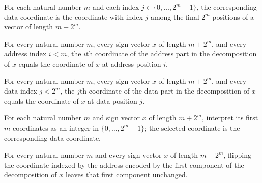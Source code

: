 \begin{definition}
\label{FABL.addressingDataCoordinate}
\leanok
For each natural number $m$ and each index $j\in\{0,\ldots,2^m-1\}$, the corresponding
data coordinate is the coordinate with index $j$ among the final $2^m$ positions of a
vector of length $m+2^m$.
\end{definition}

\begin{theorem}
\label{FABL.addressingInputEquiv_addressCoordinate}
\leanok
{}
For every natural number $m$, every sign vector $x$ of length $m+2^m$, and every address
index $i<m$, the $i$th coordinate of the address part in the decomposition of $x$ equals
the coordinate of $x$ at address position $i$.
\end{theorem}

\begin{theorem}
\label{FABL.addressingInputEquiv_dataCoordinate}
\leanok
{}
For every natural number $m$, every sign vector $x$ of length $m+2^m$, and every data
index $j<2^m$, the $j$th coordinate of the data part in the decomposition of $x$ equals
the coordinate of $x$ at data position $j$.
\end{theorem}

\begin{definition}
\label{FABL.addressingSelectedCoordinate}
\leanok
{}
For each natural number $m$ and sign vector $x$ of length $m+2^m$, interpret its first
$m$ coordinates as an integer in $\{0,\ldots,2^m-1\}$; the selected coordinate is the
corresponding data coordinate.
\end{definition}

\begin{theorem}
\label{FABL.addressingInputEquiv_first_flip_selected}
\leanok
{}
For every natural number $m$ and every sign vector $x$ of length $m+2^m$, flipping the
coordinate indexed by the address encoded by the first component of the decomposition of
$x$ leaves that first component unchanged.
\end{theorem}

